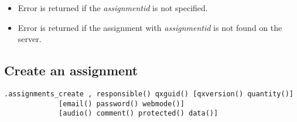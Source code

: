 \errheader
\begin{itemize}
    \item Error  is returned if the \textit{assignmentid} is not specified.
    \item Error  is returned if the assignment with \textit{assignmentid} is not found on the server.
\end{itemize}


\subsection{Create an assignment}

\begin{lstlisting}[style=CommandLineStyle]
.assignments_create , responsible() qxguid() [qxversion() quantity()]
             [email() password() webmode()]
             [audio() comment() protected() data()]
\end{lstlisting}

